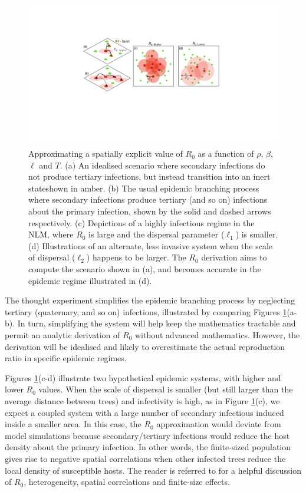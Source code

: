 \begin{figure}
    \centering
    \includegraphics[scale=0.45]{chapter5/figures/fig3a-R0-approx.pdf}
    \caption{
    Approximating a spatially explicit value of $R_0$ as a function of $\rho$, $\beta$, $\ell$ and $T$.
    (a) An idealised scenario where secondary infections do not produce tertiary infections, but instead transition into an inert state\textemdash shown in amber.
    (b) The usual epidemic branching process where secondary infections produce tertiary (and so on) infections about the primary infection, shown by the solid and dashed arrows respectively.
    (c) Depictions of a highly infectious regime in the NLM, where $R_0$ is large and the dispersal parameter ($\ell_1$) is smaller.
    (d) Illustrations of an alternate, less invasive system when the scale of dispersal ($\ell_2$) happens to be larger. 
    The $R_0$ derivation aims to compute the scenario shown in (a), and becomes accurate in the epidemic regime illustrated in (d).
    }
    \label{fig:R0-approx}
\end{figure}

The thought experiment simplifies the epidemic branching process by neglecting tertiary (quaternary, and so on) infections,
illustrated by comparing Figures \ref{fig:R0-approx}(a-b). In turn, simplifying the system will help keep the mathematics tractable and permit an analytic derivation of $R_0$ without advanced mathematics. However, the derivation will be idealised and likely to overestimate the actual reproduction ratio in specific epidemic regimes.

Figures \ref{fig:R0-approx}(c-d) illustrate two hypothetical epidemic systems, with higher and lower $R_0$ values.
When the scale of dispersal is smaller (but still larger than the average distance between trees) and infectivity is high, as in Figure \ref{fig:R0-approx}(c), we expect a coupled system with a large number of secondary infectious induced inside a smaller area. In this case, the $R_0$ approximation would deviate from model simulations because secondary/tertiary infections would reduce the host density about the primary infection.
In other words, the finite-sized population gives rise to negative spatial correlations when other infected trees reduce the local density of susceptible hosts. The reader is referred to \cite{R0-perc-ref} for a helpful discussion of $R_0$, heterogeneity, spatial correlations and finite-size effects.

